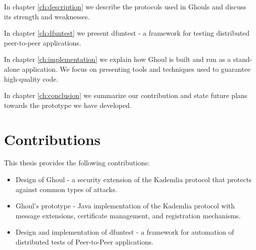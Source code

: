 In chapter \ref{ch:description} we describe the protocols used in Ghouls and
discuss its strength and weaknesses.

In chapter \ref{ch:dfuntest} we present dfuntest - a framework for testing
distributed peer-to-peer applications.

In chapter \ref{ch:implementation} we explain how Ghoul is built and run as a
stand-alone application.
We focus on presenting tools and techniques used to guarantee high-quality code.

In chapter \ref{ch:conclusion} we summarize our contribution and state future
plans towards the prototype we have developed.

\section{Contributions}
This thesis provides the following contributions:
\begin{itemize}
  \item Design of Ghoul - a security extension of the Kademlia protocol that
    protects against common types of attacks.
  \item Ghoul's prototype - Java implementation of the Kademlia protocol with
    message extensions, certificate management, and registration mechanisms.
  \item Design and implementation of dfuntest - a framework for automation of
    distributed tests of Peer-to-Peer applications.
\end{itemize}
